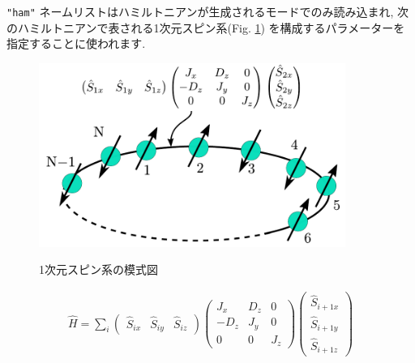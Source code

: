 \documentclass[12pt,titlepage]{jarticle}
\begin{document}
\verb|"ham"| ネームリストはハミルトニアンが生成されるモードでのみ読み込まれ,
次のハミルトニアンで表される1次元スピン系(Fig. \ref{Fig_spin})
を構成するパラメーターを指定することに使われます.

\begin{figure}[tbp]
  \begin{center}
    \includegraphics[width=10cm]{spin.pdf}
    \label{Fig_spin}
    \caption{1次元スピン系の模式図}
  \end{center}
\end{figure}

\begin{align}
  {\hat H} = \sum_{i}
  \left(
  \begin{matrix}
    {\hat S}_{i x} & {\hat S}_{i y} & {\hat S}_{i z}
  \end{matrix}
  \right)
  \left(
  \begin{matrix}
    J_x & D_z & 0 \\
    -D_z & J_y & 0 \\
    0 & 0 & J_z
  \end{matrix}
  \right)
  \left(
  \begin{matrix}
    {\hat S}_{i+1 x} \\ {\hat S}_{i+1 y} \\ {\hat S}_{i+1 z}
  \end{matrix}
  \right)
\end{align}
\end{document}
